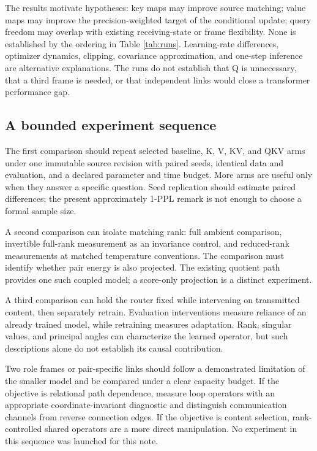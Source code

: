 \documentclass[11pt,letterpaper]{article}
\theoremstyle{remark}
\begin{document}
The results motivate hypotheses: key maps may improve source matching; value maps may improve the precision-weighted target of the conditional update; query freedom may overlap with existing receiving-state or frame flexibility. None is established by the ordering in Table \ref{tab:runs}. Learning-rate differences, optimizer dynamics, clipping, covariance approximation, and one-step inference are alternative explanations. The runs do not establish that Q is unnecessary, that a third frame is needed, or that independent links would close a transformer performance gap.

\subsection{A bounded experiment sequence}
The first comparison should repeat selected baseline, K, V, KV, and QKV arms under one immutable source revision with paired seeds, identical data and evaluation, and a declared parameter and time budget. More arms are useful only when they answer a specific question. Seed replication should estimate paired differences; the present approximately 1-PPL remark is not enough to choose a formal sample size.

A second comparison can isolate matching rank: full ambient comparison, invertible full-rank measurement as an invariance control, and reduced-rank measurements at matched temperature conventions. The comparison must identify whether pair energy is also projected. The existing quotient path provides one such coupled model; a score-only projection is a distinct experiment.

A third comparison can hold the router fixed while intervening on transmitted content, then separately retrain. Evaluation interventions measure reliance of an already trained model, while retraining measures adaptation. Rank, singular values, and principal angles can characterize the learned operator, but such descriptions alone do not establish its causal contribution.

Two role frames or pair-specific links should follow a demonstrated limitation of the smaller model and be compared under a clear capacity budget. If the objective is relational path dependence, measure loop operators with an appropriate coordinate-invariant diagnostic and distinguish communication channels from reverse connection edges. If the objective is content selection, rank-controlled shared operators are a more direct manipulation. No experiment in this sequence was launched for this note.
\end{document}
